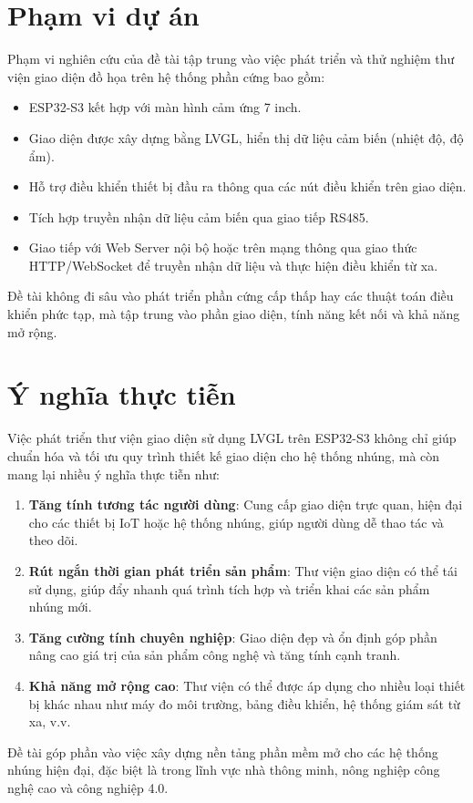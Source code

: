 \section{Phạm vi dự án}
\tab Phạm vi nghiên cứu của đề tài tập trung vào việc phát triển và thử nghiệm thư viện giao diện đồ họa trên hệ thống phần cứng bao gồm: \begin{itemize} 
\item ESP32-S3 kết hợp với màn hình cảm ứng 7 inch. 
\item Giao diện được xây dựng bằng LVGL, hiển thị dữ liệu cảm biến (nhiệt độ, độ ẩm). 
\item Hỗ trợ điều khiển thiết bị đầu ra thông qua các nút điều khiển trên giao diện. 
\item Tích hợp truyền nhận dữ liệu cảm biến qua giao tiếp RS485. 
\item Giao tiếp với Web Server nội bộ hoặc trên mạng thông qua giao thức HTTP/WebSocket để truyền nhận dữ liệu và thực hiện điều khiển từ xa.
\end{itemize} 
\tab Đề tài không đi sâu vào phát triển phần cứng cấp thấp hay các thuật toán điều khiển phức tạp, mà tập trung vào phần giao diện, tính năng kết nối và khả năng mở rộng.

\section{Ý nghĩa thực tiễn}  
\tab Việc phát triển thư viện giao diện sử dụng LVGL trên ESP32-S3 không chỉ giúp chuẩn hóa và tối ưu quy trình thiết kế giao diện cho hệ thống nhúng, mà còn mang lại nhiều ý nghĩa thực tiễn như: 
\begin{enumerate} 
\item \textbf{Tăng tính tương tác người dùng}: Cung cấp giao diện trực quan, hiện đại cho các thiết bị IoT hoặc hệ thống nhúng, giúp người dùng dễ thao tác và theo dõi. 
\item \textbf{Rút ngắn thời gian phát triển sản phẩm}: Thư viện giao diện có thể tái sử dụng, giúp đẩy nhanh quá trình tích hợp và triển khai các sản phẩm nhúng mới. 
\item \textbf{Tăng cường tính chuyên nghiệp}: Giao diện đẹp và ổn định góp phần nâng cao giá trị của sản phẩm công nghệ và tăng tính cạnh tranh. 
\item \textbf{Khả năng mở rộng cao}: Thư viện có thể được áp dụng cho nhiều loại thiết bị khác nhau như máy đo môi trường, bảng điều khiển, hệ thống giám sát từ xa, v.v. 
\end{enumerate}

\tab Đề tài góp phần vào việc xây dựng nền tảng phần mềm mở cho các hệ thống nhúng hiện đại, đặc biệt là trong lĩnh vực nhà thông minh, nông nghiệp công nghệ cao và công nghiệp 4.0.


\newpage

